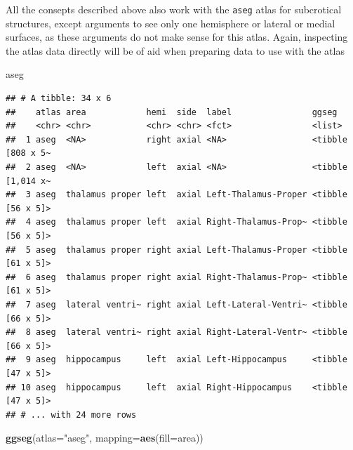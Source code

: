 \documentclass[fleqn,10pt]{wlpeerj} %
\newenvironment{Shaded}{\begin{snugshade}}{\end{snugshade}}
\newcommand{\DataTypeTok}[1]{\textcolor[rgb]{0.13,0.29,0.53}{#1}}
\newcommand{\KeywordTok}[1]{\textcolor[rgb]{0.13,0.29,0.53}{\textbf{#1}}}
\newcommand{\NormalTok}[1]{#1}
\newcommand{\StringTok}[1]{\textcolor[rgb]{0.31,0.60,0.02}{#1}}
\begin{document}
All the consepts described above also work with the \texttt{aseg} atlas for subcrotical structures, except arguments to see only one hemisphere or lateral or medial surfaces, as these arguments do not make sense for this atlas.
Again, inspecting the atlas data directly will be of aid when preparing data to use with the atlas
\small

\begin{Shaded}
\begin{Highlighting}[]
\NormalTok{aseg}
\end{Highlighting}
\end{Shaded}

\begin{verbatim}
## # A tibble: 34 x 6
##    atlas area            hemi  side  label                ggseg            
##    <chr> <chr>           <chr> <chr> <fct>                <list>           
##  1 aseg  <NA>            right axial <NA>                 <tibble [808 x 5~
##  2 aseg  <NA>            left  axial <NA>                 <tibble [1,014 x~
##  3 aseg  thalamus proper left  axial Left-Thalamus-Proper <tibble [56 x 5]>
##  4 aseg  thalamus proper left  axial Right-Thalamus-Prop~ <tibble [56 x 5]>
##  5 aseg  thalamus proper right axial Left-Thalamus-Proper <tibble [61 x 5]>
##  6 aseg  thalamus proper right axial Right-Thalamus-Prop~ <tibble [61 x 5]>
##  7 aseg  lateral ventri~ right axial Left-Lateral-Ventri~ <tibble [66 x 5]>
##  8 aseg  lateral ventri~ right axial Right-Lateral-Ventr~ <tibble [66 x 5]>
##  9 aseg  hippocampus     left  axial Left-Hippocampus     <tibble [47 x 5]>
## 10 aseg  hippocampus     left  axial Right-Hippocampus    <tibble [47 x 5]>
## # ... with 24 more rows
\end{verbatim}

\normalsize

\begin{Shaded}
\begin{Highlighting}[]
\KeywordTok{ggseg}\NormalTok{(}\DataTypeTok{atlas=}\StringTok{"aseg"}\NormalTok{, }\DataTypeTok{mapping=}\KeywordTok{aes}\NormalTok{(}\DataTypeTok{fill=}\NormalTok{area))}
\end{Highlighting}
\end{Shaded}
\end{document}
